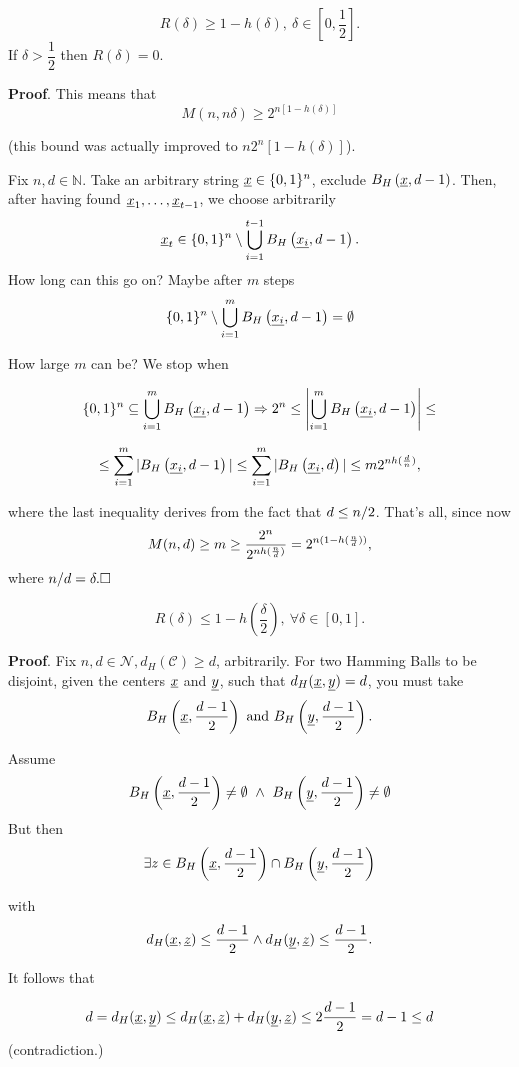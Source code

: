 \begin{thm}
 $$R(\delta) \geq 1 - h(\delta),\ \delta \in [0, \dfrac{1}{2}].$$ If $\delta > \dfrac{1}{2}$ then $R(\delta) = 0$.
\end{thm}
\textbf{Proof}. This means that
\[
 M(n, n\delta) \geq 2^{n[1-h(\delta)]}
\]

(this bound was actually improved to $n2^n[1-h(\delta)]$).

Fix $n, d \in \mathbb{N}$. Take an arbitrary string $\underline{x} \in \{0, 1\}^n$, exclude $B_H\left(\underline{x}, d-1\right)$. Then, after having found $\underline{x}_1, \ldots, \underline{x}_{t-1}$, we choose arbitrarily
\[
 \underline{x}_t \in \{0, 1\}^n \setminus \bigcup_{i = 1}^{t-1}B_H\left(\underline{x_i}, d-1\right).
\]
How long can this go on? Maybe after $m$ steps
\[
 \{0, 1\}^n \setminus \bigcup_{i = 1}^{m}B_H\left(\underline{x_i}, d-1\right) = \emptyset
\]

How large $m$ can be? We stop when 

\[
 \{0, 1\}^n \subseteq \bigcup_{i = 1}^{m}B_H\left(\underline{x_i}, d-1\right) \Rightarrow 2^n \leq \left| \bigcup_{i = 1}^{m}B_H\left(\underline{x_i}, d-1\right)\right| \leq
\]

\[
 \leq \sum_{i = 1}^m |B_H\left(\underline{x_i}, d-1\right)| \leq  \sum_{i = 1}^m |B_H\left(\underline{x_i}, d\right)| \leq m2^{nh(\frac{d}{n})},
\]

where the last inequality derives from the fact that $d \leq {n}/{2}$. That's all, since now
\[
 M(n, d) \geq m \geq \dfrac{2^n}{2^{nh(\frac{n}{d})}} = 2^{n(1-h(\frac{n}{d}))},
\]
where $\ifrac{n}{d} = \delta.\hfill\Box$

\begin{thm}
 $$R(\delta) \leq 1 - h(\dfrac{\delta}{2}),\ \forall \delta \in [0, 1].$$
\end{thm}
\noindent\textbf{Proof}. Fix $n, d \in \mathcal{N}, d_H(\mathcal{C}) \geq d$, arbitrarily. For two Hamming Balls to be disjoint, given the centers $\underline{x}$ and $\underline{y}$, such that $d_H(\underline{x}, \underline{y}) = d$, you must take 
\[ 
\hball{x}{\sfrac{d-1}{2}}\ \text{and}\ \hball{y}{\sfrac{d-1}{2}}.
\]

Assume
\[ 
B_H\left(\underline{x}, \frac{d-1}{2}\right)\not = \emptyset\ \wedge\ B_H\left(\underline{y}, \frac{d-1}{2}\right) \not = \emptyset
\]
But then
\[
 \exists z \in B_H\left(\underline{x}, \frac{d-1}{2}\right) \cap B_H\left(\underline{y}, \frac{d-1}{2}\right)
\]

with 
\[
 d_H(\underline{x}, \underline{z}) \leq \frac{d-1}{2} \wedge  d_H(\underline{y}, \underline{z}) \leq \frac{d-1}{2}.
\]

It follows that 

\[
 d = d_H(\underline{x}, \underline{y}) \leq  d_H(\underline{x}, \underline{z}) +  d_H(\underline{y}, \underline{z}) \leq 2\frac{d-1}{2} = d-1 \leq d
\]
(contradiction.)

